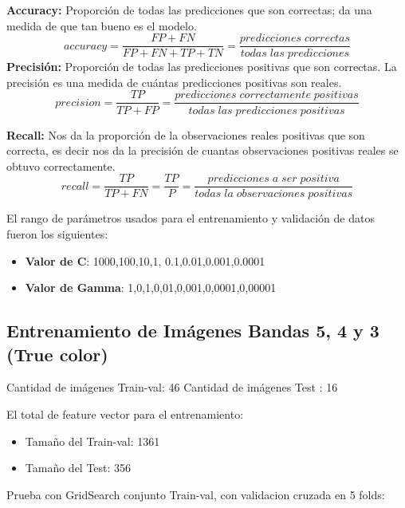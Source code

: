 \textbf{Accuracy:} Proporción de todas las predicciones que son correctas; da una medida de que tan bueno es el modelo.
\begin{equation}
accuracy = \frac{FP+FN}{FP+FN+TP+TN}=\frac{predicciones\;correctas}{todas\;las\;predicciones}
\end	{equation}
\textbf{Precisión:} Proporción de todas las predicciones positivas que son correctas. La precisión es una medida de cuántas predicciones positivas son reales.
\begin{equation}
precision=\frac{TP}{TP+FP}= \frac{predicciones\;correctamente\;positivas}{todas\;las\;predicciones\;positivas}
\end{equation}

\textbf{Recall:} Nos da la proporción de la observaciones reales positivas que son correcta, es decir nos da la precisión de cuantas observaciones positivas reales se obtuvo correctamente.
\begin{equation}
recall = \frac{TP}{TP+FN} = \frac{TP}{P} = \frac{predicciones\;a\;ser\;positiva}{todas\;la\;observaciones\;positivas} 
\end{equation}

El rango de parámetros usados para el entrenamiento y validación de datos fueron los siguientes:

\begin{itemize}
 \item \textbf{Valor de C}: 1000,100,10,1, 0.1,0.01,0.001,0.0001
 \item \textbf{Valor de Gamma}: 1,0,1,0,01,0,001,0,0001,0,00001
\end{itemize}



\subsection{Entrenamiento de Imágenes Bandas 5, 4 y 3 (True color)}\label{sub:entrenamiento_bandas543}

Cantidad de imágenes Train-val: 46 
Cantidad de imágenes Test : 16  

El total de feature vector para el entrenamiento:
\begin{itemize}
\item Tamaño del Train-val: 1361
\item Tamaño del Test: 356
\end{itemize}

Prueba con GridSearch conjunto Train-val, con validacion cruzada en 5 folds:

